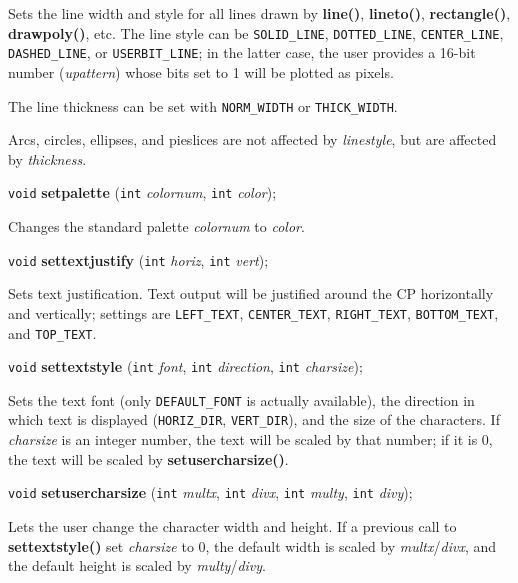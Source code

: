 \documentclass[a4paper,11pt]{article}
\newcommand{\V}{\texttt{void}}      %
\newcommand{\I}{\texttt{int}}       %
\newcommand{\func}[1]{\textbf{#1}}  %
\newcommand{\A}[1]{\emph{#1}}       %
\newcommand{\T}[1]{\texttt{#1}}     %
\newenvironment{bgi}
{ %
  \begin{snugshade}
}
{ %
  \end{snugshade}
}
\begin{document}
Sets the line width and style for all lines drawn by \func{line()},
\func{lineto()}, \func{rectangle()}, \func{drawpoly()}, etc. The line
style can be \T{SOLID\_LINE}, \T{DOTTED\_LINE}, \T{CENTER\_LINE},
\T{DASHED\_LINE}, or \T{USERBIT\_LINE}; in the latter case, the user
provides a 16-bit number (\A{upattern}) whose bits set to 1 will be
plotted as pixels.

The line thickness can be set with \T{NORM\_WIDTH} or
\T{THICK\-\_WIDTH}.

Arcs, circles, ellipses, and pieslices are not affected by
\A{linestyle}, but are affected by \A{thickness}.


\begin{bgi}
\V{} \func{setpalette} (\I{} \A{colornum}, \I{} \A{color}); 
\end{bgi}

Changes the standard palette \A{colornum} to \A{color}.


\begin{bgi}
\V{} \func{settextjustify} (\I{} \A{horiz}, \I{} \A{vert});
\end{bgi}

Sets text justification. Text output will be justified around the CP
horizontally and vertically; settings are \T{LEFT\_TEXT},
\T{CENTER\_TEXT}, \T{RIGHT\-\_TEXT}, \T{BOTTOM\_TEXT}, and
\T{TOP\_TEXT}.


\begin{bgi}
\V{} \func{settextstyle} (\I{} \A{font}, \I{} \A{direction}, \I{}
\A{charsize});
\end{bgi}

Sets the text font (only \T{DEFAULT\_FONT} is actually available), the
direction in which text is displayed (\T{HORIZ\_DIR}, \T{VERT\_DIR}),
and the size of the characters. If \A{charsize} is an integer number,
the text will be scaled by that number; if it is 0, the text will be
scaled by \func{setusercharsize()}.



\begin{bgi}
\V{} \func{setusercharsize} (\I{} \A{multx}, \I{} \A{divx}, \I{}
\A{multy}, \I{} \A{divy});
\end{bgi}

Lets the user change the character width and height. If a previous
call to \func{settextstyle()} set \A{charsize} to 0, the default width
is scaled by \A{multx}/\A{divx}, and the default height is scaled by
\A{multy}/\A{divy}.
\end{document}
